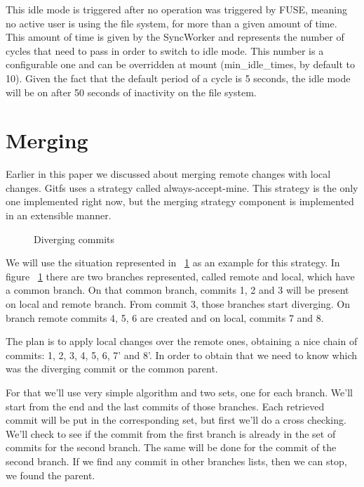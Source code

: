 This idle mode is triggered after no operation was triggered by FUSE, meaning no active user is using the file system, for more than a given amount of time. This amount of time is given by the SyncWorker and represents the number of cycles that need to pass in order to switch to idle mode. This number is a configurable one and can be overridden at mount (min\_idle\_times, by default to 10). Given the fact that the default period of a cycle is 5 seconds, the idle mode will be on after 50 seconds of inactivity on the file system.

\section{Merging}

Earlier in this paper we discussed about merging remote changes with local changes. Gitfs uses a strategy called always-accept-mine. This strategy is the only one implemented right now, but the merging strategy component is implemented in an extensible manner.

\begin{figure}[h]
  \begin{center}
    \def\svgwidth{\columnwidth}
    
  \end{center}
  \caption{Diverging commits}
  \label{fig:commits}
\end{figure}

We will use the situation represented in ~\ref{fig:commits} as an example for this strategy. In figure ~\ref{fig:commits} there are two branches represented, called remote and local, which have a common branch. On that common branch, commits 1, 2 and 3 will be present on local and remote branch. From commit 3, those branches start diverging. On branch remote commits 4, 5, 6 are created and on local, commits 7 and 8.

The plan is to apply local changes over the remote ones, obtaining a nice chain of commits: 1, 2, 3, 4, 5, 6, 7' and 8'. In order to obtain that we need to know which was the diverging commit or the common parent.

For that we'll use very simple algorithm and two sets, one for each branch. We'll start from the end and the last commits of those branches. Each retrieved commit will be put in the corresponding set, but first we'll do a cross checking. We'll check to see if the commit from the first branch is already in the set of commits for the second branch. The same will be done for the commit of the second branch. If we find any commit in other branches lists, then we can stop, we found the parent.

